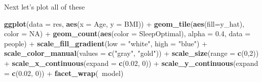 \documentclass[]{article}
\newenvironment{Shaded}{\begin{snugshade}}{\end{snugshade}}
\newcommand{\KeywordTok}[1]{\textcolor[rgb]{0.13,0.29,0.53}{\textbf{{#1}}}}
\newcommand{\DataTypeTok}[1]{\textcolor[rgb]{0.13,0.29,0.53}{{#1}}}
\newcommand{\DecValTok}[1]{\textcolor[rgb]{0.00,0.00,0.81}{{#1}}}
\newcommand{\FloatTok}[1]{\textcolor[rgb]{0.00,0.00,0.81}{{#1}}}
\newcommand{\StringTok}[1]{\textcolor[rgb]{0.31,0.60,0.02}{{#1}}}
\newcommand{\CommentTok}[1]{\textcolor[rgb]{0.56,0.35,0.01}{\textit{{#1}}}}
\newcommand{\OtherTok}[1]{\textcolor[rgb]{0.56,0.35,0.01}{{#1}}}
\newcommand{\NormalTok}[1]{{#1}}
\begin{document}
\begin{Shaded}
\end{Shaded}

Next let's plot all of these

\begin{Shaded}
\begin{Highlighting}[]
\KeywordTok{ggplot}\NormalTok{(}\DataTypeTok{data =} \NormalTok{res, }\KeywordTok{aes}\NormalTok{(}\DataTypeTok{x =} \NormalTok{Age, }\DataTypeTok{y =} \NormalTok{BMI)) +}
\StringTok{  }\KeywordTok{geom_tile}\NormalTok{(}\KeywordTok{aes}\NormalTok{(}\DataTypeTok{fill=}\NormalTok{y_hat), }\DataTypeTok{color =} \OtherTok{NA}\NormalTok{) +}
\StringTok{  }\KeywordTok{geom_count}\NormalTok{(}\KeywordTok{aes}\NormalTok{(}\DataTypeTok{color =} \NormalTok{SleepOptimal), }\DataTypeTok{alpha =} \FloatTok{0.4}\NormalTok{, }\DataTypeTok{data =} \NormalTok{people) +}
\StringTok{  }\KeywordTok{scale_fill_gradient}\NormalTok{(}\DataTypeTok{low =} \StringTok{"white"}\NormalTok{, }\DataTypeTok{high =} \StringTok{"blue"}\NormalTok{) +}
\StringTok{  }\KeywordTok{scale_color_manual}\NormalTok{(}\DataTypeTok{values =} \KeywordTok{c}\NormalTok{(}\StringTok{"gray"}\NormalTok{, }\StringTok{"gold"}\NormalTok{)) +}
\StringTok{  }\KeywordTok{scale_size}\NormalTok{(}\DataTypeTok{range =} \KeywordTok{c}\NormalTok{(}\DecValTok{0}\NormalTok{,}\DecValTok{2}\NormalTok{)) +}
\StringTok{  }\KeywordTok{scale_x_continuous}\NormalTok{(}\DataTypeTok{expand =} \KeywordTok{c}\NormalTok{(}\FloatTok{0.02}\NormalTok{, }\DecValTok{0}\NormalTok{)) +}
\StringTok{  }\KeywordTok{scale_y_continuous}\NormalTok{(}\DataTypeTok{expand =} \KeywordTok{c}\NormalTok{(}\FloatTok{0.02}\NormalTok{, }\DecValTok{0}\NormalTok{)) +}
\StringTok{  }\KeywordTok{facet_wrap}\NormalTok{(~model)}
\end{Highlighting}
\end{Shaded}
\end{document}
